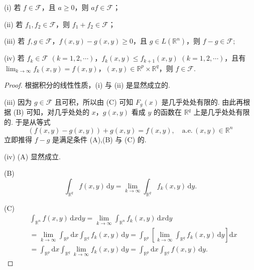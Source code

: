 \documentclass[../../main.tex]{subfiles}%
\begin{document}
\begin{lemma}\label{lemma:引理4.28}
(i) 若 \( f \in \mathcal{F} \)，且 \( a \geqslant  0 \)，则 \( af \in \mathcal{F} \)；

(ii) 若 \( f_1, f_2 \in \mathcal{F} \)，则 \( f_1 + f_2 \in \mathcal{F} \)；

(iii) 若 \( f, g \in \mathcal{F} \)，\( f(x, y) - g(x, y) \geqslant  0 \)，且 \( g \in L(\mathbb{R}^n) \)，则
\(
f - g \in \mathcal{F};
\)

(iv) 若 \( f_k \in \mathcal{F} \) \( (k = 1, 2, \cdots) \)，\( f_k(x, y) \leqslant  f_{k + 1}(x, y) \) \( (k = 1, 2, \cdots) \)，且有 \( \lim_{k \to \infty} f_k(x, y) = f(x, y) \)，\( (x, y) \in \mathbb{R}^p \times \mathbb{R}^q \)，则 \( f \in \mathcal{F} \).
\end{lemma}
\begin{proof}
根据积分的线性性质，(i) 与 (ii) 是显然成立的.

(iii) 因为 \( g \in \mathcal{F} \) 且可积，所以由 (C) 可知 \( F_g(x) \) 是几乎处处有限的. 由此再根据 (B) 可知，对几乎处处的 \( x \)，\( g(x, y) \) 看成 \( y \) 的函数在 \( \mathbb{R}^q \) 上是几乎处处有限的. 于是从等式
\[
(f(x, y) - g(x, y)) + g(x, y) = f(x, y), \quad \text{a.e.}\, (x, y) \in \mathbb{R}^n
\]
立即推得 \( f - g \) 是满足条件 (A),(B) 与 (C) 的.

(iv) (A) 显然成立.

(B)
\[
\int_{\mathbb{R}^q} f(x, y) \, \mathrm{d}y = \lim_{k \to \infty} \int_{\mathbb{R}^q} f_k(x, y) \, \mathrm{d}y.
\]

(C)
\begin{align*}
&\int_{\mathbb{R}^n} f(x, y) \, \mathrm{d}x\mathrm{d}y = \lim_{k \to \infty} \int_{\mathbb{R}^n} f_k(x, y) \, \mathrm{d}x\mathrm{d}y \\
&= \lim_{k \to \infty} \int_{\mathbb{R}^p} \mathrm{d}x \int_{\mathbb{R}^q} f_k(x, y) \, \mathrm{d}y = \int_{\mathbb{R}^p} \left[ \lim_{k \to \infty} \int_{\mathbb{R}^q} f_k(x, y) \, \mathrm{d}y \right] \mathrm{d}x \\
&= \int_{\mathbb{R}^p} \mathrm{d}x \int_{\mathbb{R}^q} \lim_{k \to \infty} f_k(x, y) \, \mathrm{d}y = \int_{\mathbb{R}^p} \mathrm{d}x \int_{\mathbb{R}^q} f(x, y) \, \mathrm{d}y.
\end{align*}
\end{proof}
\end{document}
